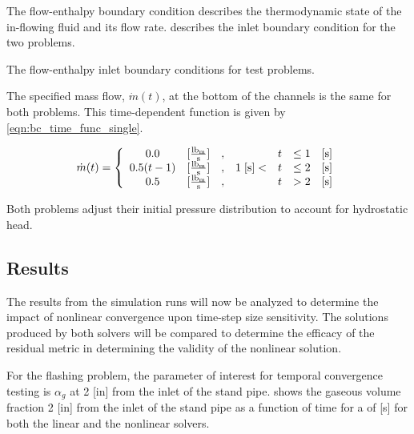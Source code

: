 The flow-enthalpy boundary condition describes the thermodynamic state of the in-flowing fluid and its flow rate.
 describes the inlet boundary condition for the two problems.

\begin{table}[ht]
\centering
\singlespace

\caption{The flow-enthalpy inlet boundary conditions for test problems.}
\label{tab:bc_fe}
\end{table}

The specified mass flow, $\dot{m}(t)$, at the bottom of the channels is the same for both problems. 
This time-dependent function is given by \eqref{eqn:bc_time_func_single}.

\begin{equation}
\label{eqn:bc_time_func_single}
\dot{m}(t) = \left\{
\begin{array}{cclrcll}
 0.0           & [\frac{ \lbm{} }{\text{s}}] & , &                & t & \leq 1 & [\text{s}] \\
 0.5 ( t - 1)  & [\frac{ \lbm{} }{\text{s}}] & , & 1\; [\text{s}] < & t & \leq 2 & [\text{s}] \\
 0.5           & [\frac{ \lbm{} }{\text{s}}] & , &                & t & > 2    & [\text{s}]
\end{array}\right.
\end{equation}

Both problems adjust their initial pressure distribution to account for hydrostatic head.

\subsection{Results}
\label{subsect:single_results}

The results from the simulation runs will now be analyzed to determine the impact of nonlinear convergence upon time-step size sensitivity.
The solutions produced by both solvers will be compared to determine the efficacy of the residual metric in determining the validity of the nonlinear solution.  

For the flashing problem, the parameter of interest for temporal convergence testing is $\alpha_g$ at 2 [in] from the inlet of the stand pipe.
 shows the gaseous volume fraction 2 [in] from the inlet of the stand pipe as a function of time for a \dtmax{} of  [s] for both the linear and the nonlinear solvers.

